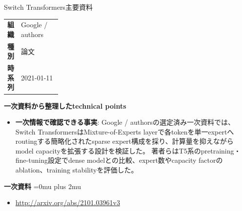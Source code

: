 \begin{technicalnote}{Switch Transformers}{主要資料}
\begingroup
\begin{tabularx}{\linewidth}{@{}>{\bfseries}p{0.22\linewidth}X@{}}
組織 & Google / authors \\
種別 & 論文 \\
時系列 & 2021-01-11 \\
\end{tabularx}
\smallskip
\begin{minipage}{\linewidth}
{\bfseries 一次資料から整理したtechnical points}
\begin{itemize}[leftmargin=1.5em,itemsep=0.35em]
\item \textbf{一次情報で確認できる事実}: Google / authorsの選定済み一次資料では、Switch TransformersはMixture-of-Experts layerで各tokenを単一expertへroutingする簡略化されたsparse expert構成を採り、計算量を抑えながらmodel capacityを拡張する設計を検証した。 著者らはT5系のpretraining・fine-tuning設定でdense modelとの比較、expert数やcapacity factorのablation、training stabilityを評価した。
\end{itemize}
\begin{minipage}{\linewidth}
\begin{samepage}
{\bfseries 一次資料}
\begingroup\sloppy
\Urlmuskip=0mu plus 2mu\relax
\begin{itemize}[leftmargin=1.5em,itemsep=0.25em]
\item {\scriptsize\url{http://arxiv.org/abs/2101.03961v3}}
\end{itemize}
\endgroup
\end{samepage}
\end{minipage}
\end{minipage}
\endgroup
\end{technicalnote}
\medskip

